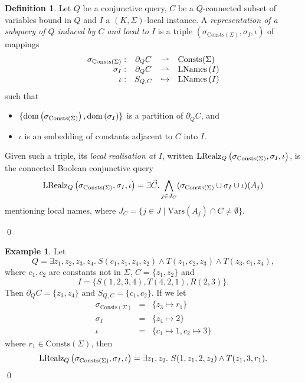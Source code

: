 \documentclass[12pt]{report}
\theoremstyle{plain}
\theoremstyle{definition}
\newtheorem{definition}[theorem]{Definition}
\newtheorem{example}[theorem]{Example}
\def\Vars{{\mathrm{Vars}}}
\def\Consts{{\mathrm{Consts}}}
\newcommand{\dom}[1]{\ensuremath{\normalfont{\operatorname{dom}} \left( #1 \right)}}
\newcommand{\LNames}[1]{\ensuremath{\normalfont{\textrm{LNames}} \left( #1 \right)}}
\newcommand{\LRealz}[2]{\ensuremath{\normalfont{\textrm{LRealz}}_{ #1 } \left( #2 \right)}}
\begin{document}
\begin{definition}
  Let $Q$ be a conjunctive query, $C$ be a $Q$-connected subset of variables bound in $Q$ and $I$ a $(K, \Sigma)$-local instance. A \emph{representation of a subquery of $Q$ induced by $C$ and local to $I$} is a triple $(\sigma_{\Consts(\Sigma)}, \sigma_I, \iota)$ of mappings
  \[\begin{array}{rccl}
    \sigma_{\Consts(\Sigma)}: & \partial_Q C &\rightharpoonup& \Consts(\Sigma) \\
    \sigma_I: & \partial_Q C &\rightharpoonup& \LNames{I} \\
    \iota: & S_{Q,C} &\hookrightarrow& \LNames{I}
  \end{array}\]
  such that \begin{itemize}
    \item $\{ \dom{\sigma_{\Consts(\Sigma)}}, \dom{\sigma_I} \}$ is a partition of $\partial_Q C$, and
    \item $\iota$ is an embedding of constants adjacent to $C$ into $I$.
  \end{itemize}

  Given such a triple, its \emph{local realisation at $I$}, written $\LRealz{Q}{\sigma_{\Consts(\Sigma)}, \sigma_I, \iota}$, is the connected Boolean conjunctive query $$
  \LRealz{Q}{\sigma_{\Consts(\Sigma)}, \sigma_I, \iota} = \exists \vec{C}. \bigwedge_{j \in J_C} (\sigma_{\Consts(\Sigma)} \cup \sigma_I \cup \iota)(A_j)
  $$
  mentioning local names, where $J_C = \{ j \in J \mid \Vars(A_j) \cap C \neq \emptyset \}$.

  \qed
\end{definition}

\begin{example}
\label{local-realisation-of-subquery-representation}
  Let
  $$
    Q = \exists z_1,z_2,z_3,z_4.\ S(c_1, z_1, z_4, z_2) \wedge T(z_1, c_2, z_3) \wedge T(z_3, c_1, z_4),
  $$
  where $c_1, c_2$ are constants not in $\Sigma$, $C = \{z_1, z_2\}$ and $$I = \{ S(1, 2, 3, 4), T(4, 2, 1), R(2, 3) \}.$$
  Then $\partial_Q C = \{ z_3, z_4 \}$ and $S_{Q,C} = \{c_1, c_2\}$. If we let
  \[\begin{array}{rcl}
    \sigma_{\Consts(\Sigma)} &=& \{ z_3 \mapsto r_1 \} \\
    \sigma_I &=& \{ z_4 \mapsto 2 \} \\
    \iota &=& \{ c_1 \mapsto 1, c_2 \mapsto 3 \}
  \end{array}\]
  where $r_1 \in \Consts(\Sigma)$, then $$
  \LRealz{Q}{\sigma_{\Consts(\Sigma)}, \sigma_I, \iota} = \exists z_1, z_2.\ S(1, z_1, 2, z_2) \wedge T(z_1, 3, r_1).
  $$
  \qed
\end{example}
\end{document}
